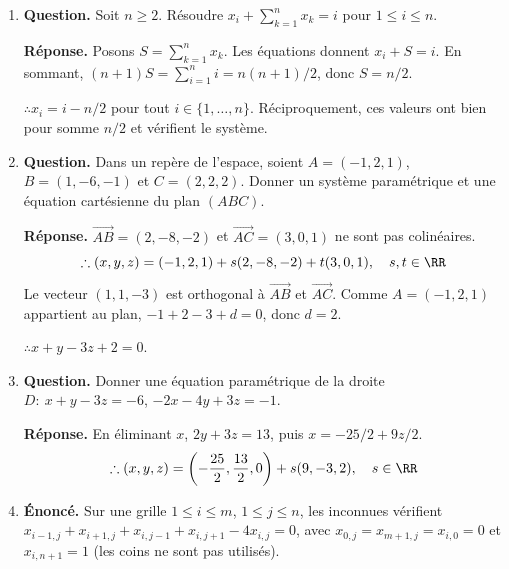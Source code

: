 \documentclass[12pt, a4paper]{article}
\begin{document}
\begin{enumerate}[label=3.\arabic*., start=25]
\begin{minipage}[t]{\linewidth}
\begin{enumerate}[\arabic*.]
        Si $m=2$, $(x,y)=(-2,0)+\lambda(-1,1)$, où $\lambda\in\RR$.
        Si $m=3$, aucune solution.

\end{enumerate}
\end{minipage}

  \item \begin{minipage}[t]{\linewidth}\raggedright
\textbf{Question.} Soit $n\geq2$. Résoudre $x_i+\sum_{k=1}^nx_k=i$ pour $1\leq i\leq n$.
\par\smallskip
\textbf{Réponse.} Posons $S=\sum_{k=1}^n x_k$. Les équations donnent $x_i+S=i$.
    En sommant, $(n+1)S=\sum_{i=1}^n i=n(n+1)/2$, donc $S=n/2$.

    $\therefore x_i=i-n/2$ pour tout $i\in\{1,\ldots,n\}$.
    Réciproquement, ces valeurs ont bien pour somme $n/2$ et vérifient le système.
\end{minipage}

  \item \begin{minipage}[t]{\linewidth}\raggedright
\textbf{Question.} Dans un repère de l'espace, soient $A=(-1,2,1)$, $B=(1,-6,-1)$ et $C=(2,2,2)$. Donner un système paramétrique et une équation cartésienne du plan $(ABC)$.
\par\smallskip
\textbf{Réponse.} $\vec{AB}=(2,-8,-2)$ et $\vec{AC}=(3,0,1)$ ne sont pas colinéaires.
    \[
      \therefore (x,y,z)=(-1,2,1)+s(2,-8,-2)+t(3,0,1),\quad s,t\in\RR
    \]
    Le vecteur $(1,1,-3)$ est orthogonal à $\vec{AB}$ et $\vec{AC}$.
    Comme $A=(-1,2,1)$ appartient au plan, $-1+2-3+d=0$, donc $d=2$.

    $\therefore x+y-3z+2=0$.
\end{minipage}

  \item \begin{minipage}[t]{\linewidth}\raggedright
\textbf{Question.} Donner une équation paramétrique de la droite $D:\ x+y-3z=-6$, $-2x-4y+3z=-1$.
\par\smallskip
\textbf{Réponse.} En éliminant $x$, $2y+3z=13$, puis $x=-25/2+9z/2$.
    \[
      \therefore (x,y,z)=\left(-\frac{25}2,\frac{13}2,0\right)+s(9,-3,2),\quad s\in\RR
    \]
\end{minipage}

  \item \begin{minipage}[t]{\linewidth}\raggedright
\textbf{Énoncé.} Sur une grille $1\leq i\leq m$, $1\leq j\leq n$, les inconnues vérifient $x_{i-1,j}+x_{i+1,j}+x_{i,j-1}+x_{i,j+1}-4x_{i,j}=0$, avec $x_{0,j}=x_{m+1,j}=x_{i,0}=0$ et $x_{i,n+1}=1$ (les coins ne sont pas utilisés).


\end{minipage}
\end{enumerate}
\end{document}
